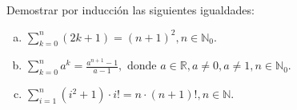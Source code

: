 \begin{problem}{}{}

    Demostrar por inducción las siguientes igualdades:

    \begin{enumerate}[(a)]
        \item $\sum_{k=0}^{n} (2k + 1) = {(n + 1)}^2, n \in \mathbb{N}_0$.
        \item $\sum_{k=0}^{n} a^k = \frac{a^{n + 1} - 1}{a - 1}, \text{ donde } a \in \mathbb{R}, a \neq 0, a \neq 1, n \in \mathbb{N}_0$.
        \item $\sum_{i=1}^{n} (i^2 + 1) \cdot i! = n \cdot (n + 1)!, n \in \mathbb{N}$.
    \end{enumerate}

\end{problem}
\vspace{1ex}

